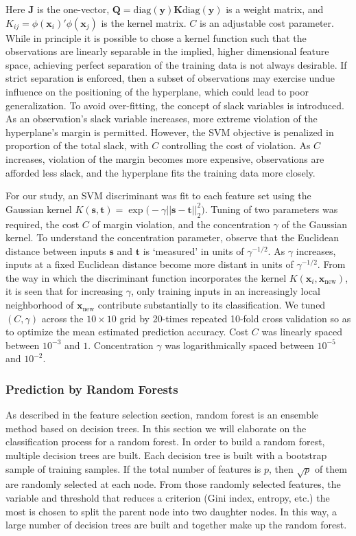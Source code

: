 \documentclass[a4paper]{article}
\begin{document}
Here $\bm{J}$ is the one-vector, $\bm{Q} = \text{diag}(\bm{y})\bm{K}\text{diag}(\bm{y})$ is a weight matrix, and $K_{ij} = \phi(\bm{x}_{i})'\phi(\bm{x}_{j})$ is the kernel matrix. $C$ is an adjustable cost parameter. While in principle it is possible to chose a kernel function such that the observations are linearly separable in the implied, higher dimensional feature space, achieving perfect separation of the training data is not always desirable. If strict separation is enforced, then a subset of observations may exercise undue influence on the positioning of the hyperplane, which could lead to poor generalization. To avoid over-fitting, the concept of slack variables is introduced. As an observation's slack variable increases, more extreme violation of the hyperplane's margin is permitted. However, the SVM objective is penalized in proportion of the total slack, with $C$ controlling the cost of violation. As $C$ increases, violation of the margin becomes more expensive, observations are afforded less slack, and the hyperplane fits the training data more closely. 

For our study, an SVM discriminant was fit to each feature set using the Gaussian kernel $K(\bm{s},\bm{t}) = \exp\big(-\gamma ||\bm{s}-\bm{t}||_{2}^{2}\big)$. Tuning of two parameters was required, the cost $C$ of margin violation, and the concentration $\gamma$ of the Gaussian kernel. To understand the concentration parameter, observe that the Euclidean distance between inputs $\bm{s}$ and $\bm{t}$ is `measured' in units of $\gamma^{-1/2}$. As $\gamma$ increases, inputs at a fixed Euclidean distance become more distant in units of $\gamma^{-1/2}$. From the way in which the discriminant function incorporates the kernel $K(\bm{x}_{i},\bm{x}_{\text{new}})$, it is seen that for increasing $\gamma$, only training inputs in an increasingly local neighborhood of $\bm{x}_{\text{new}}$ contribute substantially to its classification. We tuned $(C,\gamma)$ across the $10 \times 10$ grid by 20-times repeated 10-fold cross validation so as to optimize the mean estimated prediction accuracy. Cost $C$ was linearly spaced between $10^{-3}$ and $1$. Concentration $\gamma$ was logarithmically spaced between $10^{-5}$ and $10^{-2}$.  

\subsubsection{Prediction by Random Forests}
As described in the feature selection section, random forest is an ensemble method based on decision trees. In this section we will elaborate on the classification process for a random forest. In order to build a random forest, multiple decision trees are built. Each decision tree is built with a bootstrap sample of training samples. If the total number of features is $p$, then $\sqrt{p}$ of them are randomly selected at each node. From those randomly selected features, the variable and threshold that reduces a criterion (Gini index, entropy, etc.) the most is chosen to split the parent node into two daughter nodes. In this way, a large number of decision trees are built and together make up the random forest. 
\end{document}
